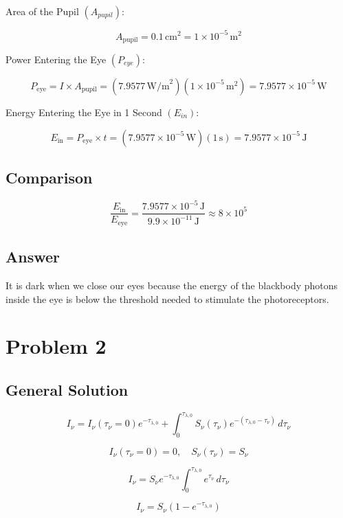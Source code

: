 \documentclass[12pt]{article}
\begin{document}
Area of the Pupil $(A_{pupil})$:

\[
    A_{\text{pupil}}
    = 0.1\, \text{cm}^2
    = 1 \times 10^{-5}\, \text{m}^2
\]

Power Entering the Eye $(P_{eye})$:

\[
    P_{\text{eye}}
    = I \times A_{\text{pupil}}
    = (7.9577\, \text{W/m}^2)(1 \times 10^{-5}\, \text{m}^2)
    = 7.9577 \times 10^{-5}\, \text{W}
\]

Energy Entering the Eye in 1 Second $(E_{in})$:

\[
    E_{\text{in}}
    = P_{\text{eye}} \times t
    = (7.9577 \times 10^{-5}\, \text{W})(1\, \text{s})
    = 7.9577 \times 10^{-5}\, \text{J}
\]

\subsection{Comparison}

\[
    \frac{E_{\text{in}}}{E_{\text{eye}}}
    = \frac{7.9577 \times 10^{-5}\, \text{J}}{9.9 \times 10^{-11}\, \text{J}} \approx 8 \times 10^5
\]

\subsection{Answer}

It is dark when we close our eyes because the energy of the blackbody photons inside the eye is
below the threshold needed to stimulate the photoreceptors.

\newpage

\section{Problem 2}

\subsection{General Solution}

\[
    I_\nu = I_\nu(\tau_\nu=0) e^{-\tau_{\lambda,0}} + \int_{0}^{\tau_{\lambda,0}} S_\nu(\tau_\nu) e^{-(\tau_{\lambda,0} - \tau_\nu)} \, d\tau_\nu
\]

\[
    I_\nu(\tau_\nu=0) = 0,\quad S_\nu(\tau_\nu) = S_\nu
\]

\[
    I_\nu = S_\nu e^{-\tau_{\lambda,0}} \int_{0}^{\tau_{\lambda,0}} e^{\tau_\nu} \, d\tau_\nu
\]

\[
    I_\nu = S_\nu (1 - e^{-\tau_{\lambda,0}})
\]
\end{document}
